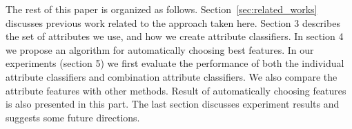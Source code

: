 The rest of this paper is organized as follows. Section~\ref{sec:related_works} discusses
previous work related to the approach taken here. Section 3
describes the set of attributes we use, and how we create attribute
classifiers. In section 4 we propose an algorithm for automatically
choosing best features. In our experiments (section 5) we first
evaluate the performance of both the individual attribute classifiers
and combination attribute classifiers. We also compare the attribute features 
with other methods. Result of automatically choosing features is also presented in this part.
The last section discusses experiment results and suggests some future directions.
